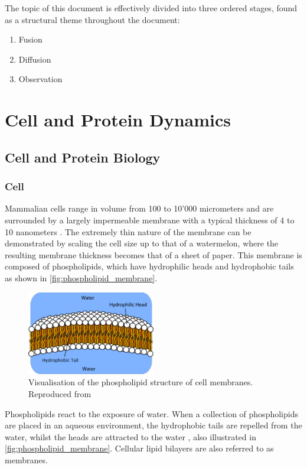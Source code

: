 \documentclass{report}
\begin{document}
The topic of this document is effectively divided into three ordered stages, found as a structural theme throughout the document:
\begin{enumerate}
	\item Fusion
	\item Diffusion
	\item Observation
\end{enumerate}

\part{Cell and Protein Dynamics}
\chapter{Cell and Protein Biology}
\section{Cell}
Mammalian cells range in volume from 100 to 10'000 micrometers and are surrounded by a largely impermeable membrane with a typical thickness of 4 to 10 nanometers \cite{milo2010bionumbers}. The extremely thin nature of the membrane can be demonstrated by scaling the cell size up to that of a watermelon, where the resulting membrane thickness becomes that of a sheet of paper. This membrane is composed of phospholipids, which have hydrophilic heads and hydrophobic tails as shown in \autoref{fig:phospholipid_membrane}.

\begin{figure}
	\centering
	\includegraphics[width = 0.5\textwidth]{phospholipid_membrane.png}
	\caption{Visualisation of the phospholipid structure of cell membranes. Reproduced from \cite{soult2020phospholipids}}
	\label{fig:phospholipid_membrane}
\end{figure}

Phospholipids react to the exposure of water. When a collection of phospholipids are placed in an aqueous environment, the hydrophobic tails are repelled from the water, whilst the heads are attracted to the water \cite{yeagle1978phospholipid}, also illustrated in \autoref{fig:phospholipid_membrane}. Cellular lipid bilayers are also referred to as membranes.
\end{document}
